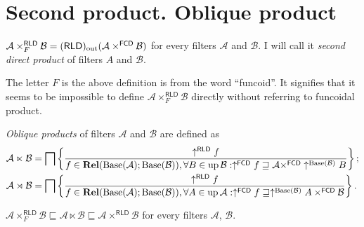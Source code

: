 \section{Second product. Oblique product}
\begin{defn}
$\mathcal{A}\times_{F}^{\mathsf{RLD}}\mathcal{B}=(\mathsf{RLD})_{\mathrm{out}}(\mathcal{A}\times^{\mathsf{FCD}}\mathcal{B})$
for every filters $\mathcal{A}$ and $\mathcal{B}$. I will call it
\emph{second direct product} of filters $A$ and $\mathcal{B}$.\end{defn}
\begin{rem}
The letter $F$ is the above definition is from the word ``funcoid''.
It signifies that it seems to be impossible to define $\mathcal{A}\times_{F}^{\mathsf{RLD}}\mathcal{B}$
directly without referring to funcoidal product.\end{rem}
\begin{defn}
\emph{Oblique products} of filters $\mathcal{A}$
and $\mathcal{B}$ are defined as
\begin{align*}
\mathcal{A}\ltimes\mathcal{B} & =\bigsqcap\left\{ \frac{\uparrow^{\mathsf{RLD}}f}{f\in\mathbf{Rel}(\operatorname{Base}(\mathcal{A});\operatorname{Base}(\mathcal{B})),\forall B\in\operatorname{up}\mathcal{B}:\uparrow^{\mathsf{FCD}}f\sqsupseteq\mathcal{A}\times^{\mathsf{FCD}}\uparrow^{\operatorname{Base}(\mathcal{B})}B}\right\};\\
\mathcal{A}\rtimes\mathcal{B} & =\bigsqcap\left\{ \frac{\uparrow^{\mathsf{RLD}}f}{f\in\mathbf{Rel}(\operatorname{Base}(\mathcal{A});\operatorname{Base}(\mathcal{B})),\forall A\in\operatorname{up}\mathcal{A}:\uparrow^{\mathsf{FCD}}f\sqsupseteq\uparrow^{\operatorname{Base}(\mathcal{B})}A\times^{\mathsf{FCD}}\mathcal{B}}\right\}.
\end{align*}
\end{defn}
\begin{prop}
$\mathcal{A}\times_{F}^{\mathsf{RLD}}\mathcal{B}\sqsubseteq\mathcal{A}\ltimes\mathcal{B}\sqsubseteq\mathcal{A}\times^{\mathsf{RLD}}\mathcal{B}$
for every filters $\mathcal{A}$, $\mathcal{B}$.\end{prop}
